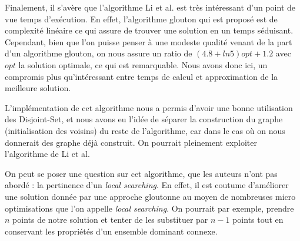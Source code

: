 Finalement, il s'avère que l'algorithme Li et al. est très intéressant d'un point de vue temps d'exécution. En effet, l'algorithme glouton qui est proposé est de complexité linéaire ce qui assure de trouver une solution en un temps séduisant. Cependant, bien que l'on puisse penser à une modeste qualité venant de la part d'un algorithme glouton, on nous assure un ratio de $(4.8+ln5)opt+1.2$ avec $opt$ la solution optimale, ce qui est remarquable. Nous avons donc ici, un compromis plus qu'intéressant entre temps de calcul et approximation de la meilleure solution.

L'implémentation de cet algorithme nous a permis d'avoir une bonne utilisation des Disjoint-Set, et nous avons eu l'idée de séparer la construction du graphe (initialisation des voisins) du reste de l'algorithme, car dans le cas où on nous donnerait des graphe déjà construit. On pourrait pleinement exploiter l'algorithme de Li et al.

On peut se poser une question sur cet algorithme, que les auteurs n'ont pas abordé : la pertinence d'un \textit{local searching}. En effet, il est coutume d'améliorer une solution donnée par une approche gloutonne au moyen de nombreuses micro optimisations que l'on appelle \textit{local searching}. On pourrait par exemple, prendre $n$ points de notre solution et tenter de les substituer par $n-1$ points tout en conservant les propriétés d'un ensemble dominant connexe.